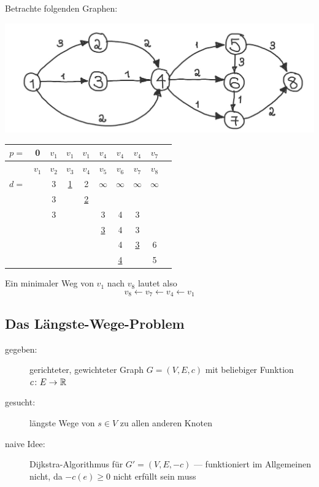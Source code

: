 \begin{beispiel}
	Betrachte folgenden Graphen:

	\begin{minipage}{\dimexpr0.5\linewidth-\fboxrule-\fboxsep}
		\centering
		\includegraphics[width=\linewidth]{./optinum_abb/optinum_5_3_bsp5-2.jpg}
	\end{minipage}
	\begin{minipage}{\dimexpr0.5\linewidth-\fboxrule-\fboxsep}
		\begin{tabular}{rccccccccc}
			$p =$ & 0 & $v_1$ & $v_1$ & $v_1$ & $v_4$ & $v_4$ & $v_4$ & \cancel{$v_5$} $v_7$ \\ \hline
			    & $v_1$ & $v_2$ & $v_3$ & $v_4$ & $v_5$ & $v_6$ & $v_7$ & $v_8$ \\ \hline
			$d =$ & \fbox{0} & 3 & \uline{1} & 2 & $\infty$ & $\infty$ & $\infty$ & $\infty$ \\
				&          & 3 &           & \uline{2} & &  & &  \\
				&          & 3 &           &        & 3         & 4 & 3 & \\
				&          &   &           &        & \uline{3} & 4 & 3 & \\
				&          &   &           &        &           & 4 & \uline{3} & 6 \\
				&          &   &           &        &           & \uline{4} &           & 5 \\
		\end{tabular}
	\end{minipage}

	Ein minimaler Weg von $v_1$ nach $v_8$ lautet also
	\begin{equation*}
		v_8 \leftarrow v_7 \leftarrow v_4 \leftarrow v_1
	\end{equation*}
\end{beispiel}


\subsection{Das Längste-Wege-Problem}
\begin{description}
	\item[gegeben:] gerichteter, gewichteter Graph $G = (V,E,c)$ mit beliebiger Funktion $\abb{c}{E}{\R}$
	\item[gesucht:] längste Wege von $s \in V$ zu allen anderen Knoten
	\item[naive Idee:] Dijkstra-Algorithmus für $G' = (V,E,-c)$ --- funktioniert im Allgemeinen nicht, da $-c(e) \ge 0$ nicht erfüllt sein muss
\end{description}

